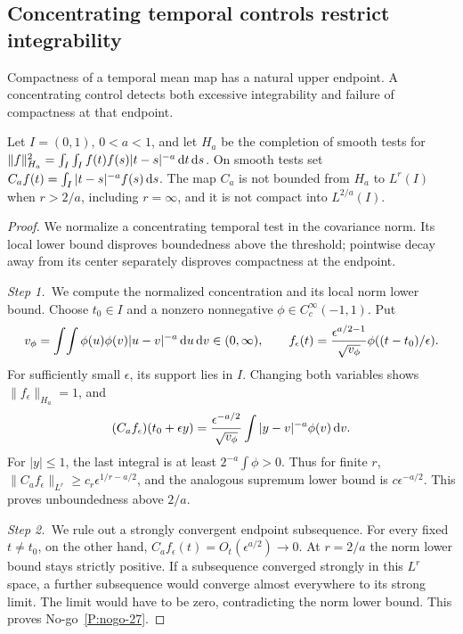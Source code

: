 \subsection{Concentrating temporal controls restrict integrability}
\label{S:nogo-27}

Compactness of a temporal mean map has a natural upper endpoint. A
concentrating control detects both excessive integrability and failure of
compactness at that endpoint.

\setcounter{nogo}{26}
\begin{nogo}
  \label{P:nogo-27}
  Let $I=(0,1)$, $0<a<1$, and let $H_a$ be the completion of smooth tests for
  $\|f\|_{H_a}^2=\int_I\int_I f(t)f(s)|t-s|^{-a}\,\mathrm{d} t\,\mathrm{d} s$.
  On smooth tests set $C_af(t)=\int_I|t-s|^{-a}f(s)\,\mathrm{d} s$.
  The map $C_a$ is not bounded from $H_a$ to $L^r(I)$ when $r>2/a$,
  including $r=\infty$, and it is not compact into $L^{2/a}(I)$.
\end{nogo}
\begin{proof}
  We normalize a concentrating temporal test in the covariance norm. Its local
  lower bound disproves boundedness above the threshold; pointwise decay away
  from its center separately disproves compactness at the endpoint.


  \medskip
  \noindent\textit{Step 1.~}We compute the normalized concentration and its
  local norm lower bound.
  Choose $t_0\in I$ and a nonzero nonnegative
  $\phi\in C_c^\infty(-1,1)$. Put
  \[
    v_\phi=\int\!\int\phi(u)\phi(v)|u-v|^{-a}\,\mathrm{d} u\,\mathrm{d} v\in(0,\infty),
    \qquad
    f_\epsilon(t)=\frac{\epsilon^{a/2-1}}{\sqrt{v_\phi}}
    \phi((t-t_0)/\epsilon).
  \]
  For sufficiently small $\epsilon$, its support lies in $I$. Changing both
  variables shows $\|f_\epsilon\|_{H_a}=1$, and
  \[
    (C_af_\epsilon)(t_0+\epsilon y)
    =\frac{\epsilon^{-a/2}}{\sqrt{v_\phi}}
    \int|y-v|^{-a}\phi(v)\,\mathrm{d} v.
  \]
  For $|y|\le1$, the last integral is at least $2^{-a}\int\phi>0$.
  Thus for finite $r$,
  $\|C_af_\epsilon\|_{L^r}\ge c_r\epsilon^{1/r-a/2}$, and the analogous
  supremum lower bound is $c\epsilon^{-a/2}$. This proves unboundedness above
  $2/a$.

  \medskip
  \noindent\textit{Step 2.~}We rule out a strongly convergent endpoint
  subsequence.
  For every fixed $t\ne t_0$, on the other hand,
  $C_af_\epsilon(t)=O_t(\epsilon^{a/2})\to0$.
  At $r=2/a$ the norm lower bound stays strictly positive. If a subsequence
  converged strongly in this $L^r$ space, a further subsequence would converge
  almost everywhere to its strong limit. The limit would have to be zero,
  contradicting the norm lower bound. This proves No-go~\ref{P:nogo-27}.
\end{proof}

